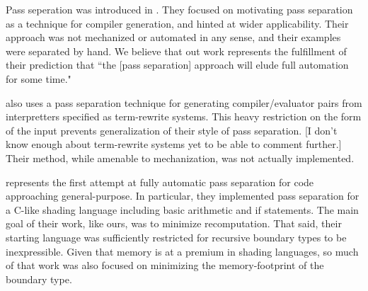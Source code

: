 \documentclass{article}
\begin{document}
Pass seperation was introduced in \cite{jorring}.  They focused on motivating pass separation as a technique for compiler generation, and hinted at wider applicability.  Their approach was not mechanized or automated in any sense, and their examples were separated by hand.  We believe that out work represents the fulfillment of their prediction that ``the [pass separation] approach will elude full automation for some time."

\cite{hannan94} also uses a pass separation technique for generating compiler/evaluator pairs from interpretters specified as term-rewrite systems.  This heavy restriction on the form of the input prevents generalization of their style of pass separation.  [I don't know enough about term-rewrite systems yet to be able to comment further.]  Their method, while amenable to mechanization, was not actually implemented.

\cite{knoblock} represents the first attempt at fully automatic pass separation for code approaching general-purpose.  In particular, they implemented pass separation for a C-like shading language including basic arithmetic and if statements.  The main goal of their work, like ours, was to minimize recomputation. That said, their starting language was sufficiently restricted for recursive boundary types to be inexpressible.  Given that memory is at a premium in shading languages, so much of that work was also focused on minimizing the memory-footprint of the boundary type.



\end{document}
